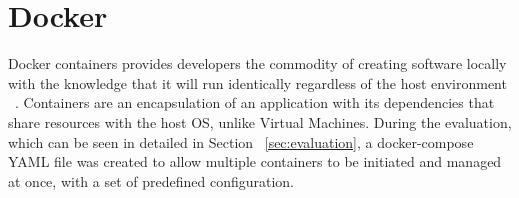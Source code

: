 \section{Docker}
Docker containers provides developers the commodity of creating software locally with the knowledge that it will run identically regardless of the host environment ~\cite{using_docker_book}. Containers are an encapsulation of an application with its dependencies that share resources with the host OS, unlike Virtual Machines. During the evaluation, which can be seen in detailed in Section ~\ref{sec:evaluation}, a docker-compose YAML file was created to allow multiple containers to be initiated and managed at once, with a set of predefined configuration.